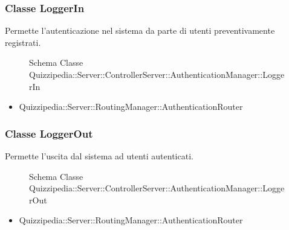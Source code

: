 \subsubsection{Classe LoggerIn}
Permette l'autenticazione nel sistema da parte di utenti preventivamente registrati.
\begin{figure}[H]
\centering
\noindent{}
\caption[Schema Classe LoggerIn]{Schema Classe Quizzipedia::Server::ControllerServer::AuthenticationManager::LoggerIn}
\end{figure}
\begin{itemize}
\item Quizzipedia::Server::RoutingManager::AuthenticationRouter
\end{itemize}
\subsubsection{Classe LoggerOut}
Permette l'uscita dal sistema ad utenti autenticati.
\begin{figure}[H]
\centering
\noindent{}
\caption[Schema Classe LoggerOut]{Schema Classe Quizzipedia::Server::ControllerServer::AuthenticationManager::LoggerOut}
\end{figure}
\begin{itemize}
\item Quizzipedia::Server::RoutingManager::AuthenticationRouter
\end{itemize}
